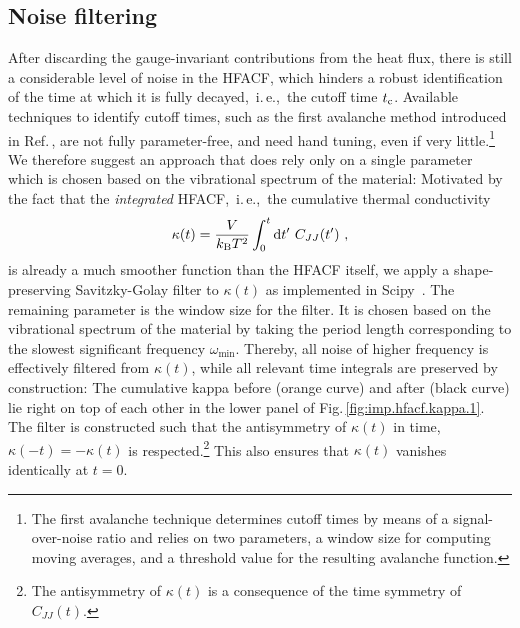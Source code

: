 \subsection{Noise filtering}
After discarding the gauge-invariant contributions from the heat flux, there is still a considerable level of noise in the HFACF, which hinders a robust identification of the time at which it is fully decayed,~i.\,e.,~the cutoff time $t_{\rm c}$. Available techniques to identify cutoff times, such as the first avalanche method introduced in Ref.\,\cite{Chen2010}, are not fully parameter-free, and need hand tuning, even if very little.\footnote{The first avalanche technique determines cutoff times by means of a signal-over-noise ratio and relies on two parameters, a window size for computing moving averages, and a threshold value for the resulting avalanche function.} We therefore suggest an approach that does rely only on a single parameter which is chosen based on the vibrational spectrum of the material: Motivated by the fact that the \emph{integrated} HFACF,~i.\,e.,~the cumulative thermal conductivity
\begin{align}
	\kappa (t)
		=
		\frac{V}{k_{\rm B} T^2} 
		\int_{0}^{t} 
		\d t' ~ C_{JJ} (t')~,
	\label{eq:imp.kappa.cum}
\end{align}
is already a much smoother function than the HFACF itself, we apply a shape-preserving Savitzky-Golay filter to $\kappa (t)$ as implemented in Scipy~\cite{Savitzky1964,scipy}. The remaining parameter is the window size for the filter. It is chosen based on the vibrational spectrum of the material by taking the period length corresponding to the slowest significant frequency $\omega_{\min}$. Thereby, all noise of higher frequency is effectively filtered from $\kappa (t)$, while all relevant time integrals are preserved by construction: The cumulative kappa before (orange curve) and after (black curve) lie right on top of each other in the lower panel of Fig.\,\ref{fig:imp.hfacf.kappa.1}. The filter is constructed such that the antisymmetry of $\kappa (t)$ in time, $\kappa (-t) = - \kappa (t)$ is respected.\footnote{The antisymmetry of $\kappa (t)$ is a consequence of the time symmetry of $C_{JJ} (t)$.} This also ensures that $\kappa (t)$ vanishes identically at $t=0$.

